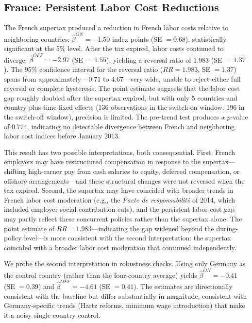 \documentclass[12pt]{article}
\begin{document}
\subsection{France: Persistent Labor Cost Reductions}

The French supertax produced a reduction in French labor costs relative to neighboring countries: $\hat{\beta}^{ON} = -1.50$ index points (SE $= 0.68$), statistically significant at the 5\% level. After the tax expired, labor costs continued to diverge: $\hat{\beta}^{OFF} = -2.97$ (SE $= 1.55$), yielding a reversal ratio of 1.983 (SE $= 1.37$). The 95\% confidence interval for the reversal ratio ($RR = 1.983$, SE $= 1.37$) spans from approximately $-0.71$ to $4.67$---very wide, unable to reject either full reversal or complete hysteresis. The point estimate suggests that the labor cost gap roughly doubled after the supertax expired, but with only 5 countries and country-plus-time fixed effects (136 observations in the switch-on window, 196 in the switch-off window), precision is limited. The pre-trend test produces a $p$-value of 0.774, indicating no detectable divergence between French and neighboring labor cost indices before January 2013.

This result has two possible interpretations, both consequential. First, French employers may have restructured compensation in response to the supertax---shifting high-earner pay from cash salaries to equity, deferred compensation, or offshore arrangements---and these structural changes were not reversed when the tax expired. Second, the supertax may have coincided with broader trends in French labor cost moderation (e.g., the \textit{Pacte de responsabilit\'{e}} of 2014, which included employer social contribution cuts), and the persistent labor cost gap may partly reflect these concurrent policies rather than the supertax alone. The point estimate of $RR = 1.983$---indicating the gap widened beyond the during-policy level---is more consistent with the second interpretation: the supertax coincided with a broader labor cost moderation that continued independently.

We probe the second interpretation in robustness checks. Using only Germany as the control country (rather than the four-country average) yields $\hat{\beta}^{ON} = -0.41$ (SE $= 0.39$) and $\hat{\beta}^{OFF} = -4.61$ (SE $= 0.41$). The estimates are directionally consistent with the baseline but differ substantially in magnitude, consistent with Germany-specific trends (Hartz reforms, minimum wage introduction) that make it a noisy single-country control.
\end{document}

